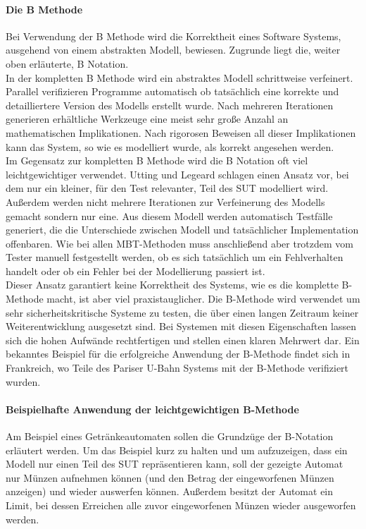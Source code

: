 \paragraph{Die B Methode}
\label{sec:bmethod}
Bei Verwendung der B Methode wird die Korrektheit eines Software Systems, ausgehend von einem abstrakten Modell, bewiesen. Zugrunde liegt die, weiter oben erläuterte, B Notation.\\
In der kompletten B Methode wird ein abstraktes Modell schrittweise verfeinert. Parallel verifizieren Programme automatisch ob tatsächlich eine korrekte und detailliertere Version des Modells erstellt wurde. Nach mehreren Iterationen generieren erhältliche Werkzeuge eine meist sehr große Anzahl an mathematischen Implikationen. Nach rigorosen Beweisen all dieser Implikationen kann das System, so wie es modelliert wurde, als korrekt angesehen werden.\\
Im Gegensatz zur kompletten B Methode wird die B Notation oft viel leichtgewichtiger verwendet. Utting und Legeard\cite{utting_practical_2007} schlagen einen Ansatz vor, bei dem nur ein kleiner, für den Test relevanter, Teil des SUT modelliert wird. Außerdem werden nicht mehrere Iterationen zur Verfeinerung des Modells gemacht sondern nur eine. Aus diesem Modell werden automatisch Testfälle generiert, die die Unterschiede zwischen Modell und tatsächlicher Implementation offenbaren. Wie bei allen MBT-Methoden muss anschließend aber trotzdem vom Tester manuell festgestellt werden, ob es sich tatsächlich um ein Fehlverhalten handelt oder ob ein Fehler bei der Modellierung passiert ist.\\
Dieser Ansatz garantiert keine Korrektheit des Systems, wie es die komplette B-Methode macht, ist aber viel praxistauglicher. Die B-Methode wird verwendet um sehr sicherheitskritische Systeme zu testen, die über einen langen Zeitraum keiner Weiterentwicklung ausgesetzt sind. Bei Systemen mit diesen Eigenschaften lassen sich die hohen Aufwände rechtfertigen und stellen einen klaren Mehrwert dar. Ein bekanntes Beispiel für die erfolgreiche Anwendung der B-Methode findet sich in Frankreich, wo Teile des Pariser U-Bahn Systems mit der B-Methode verifiziert wurden. \cite{lecomte_formal_2007}

\paragraph{Beispielhafte Anwendung der leichtgewichtigen B-Methode}
Am Beispiel eines Getränkeautomaten sollen die Grundzüge der B-Notation erläutert werden. Um das Beispiel kurz zu halten und um aufzuzeigen, dass ein Modell nur einen Teil des SUT repräsentieren kann, soll der gezeigte Automat nur Münzen aufnehmen können (und den Betrag der eingeworfenen Münzen anzeigen) und wieder auswerfen können. Außerdem besitzt der Automat ein Limit, bei dessen Erreichen alle zuvor eingeworfenen Münzen wieder ausgeworfen werden.

